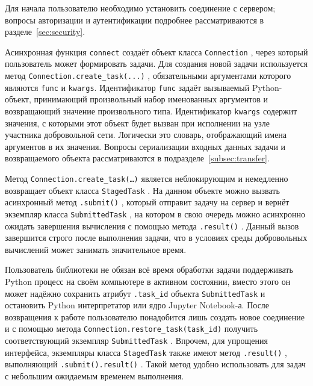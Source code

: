 \documentclass[a4paper,12pt]{extarticle}
\newcommand{\code}[1]{%
    \begingroup
    \setlength{\fboxsep}{1.2pt}%
    \colorbox{inlinecodebg}{\texttt{\textcolor{inlinecodefg}{#1}}}%
    \endgroup
}
\begin{document}
Для начала пользователю необходимо установить соединение с сервером; вопросы авторизации и аутентификации подробнее рассматриваются в разделе~\ref{sec:security}.

Асинхронная функция \code{connect} создаёт объект класса \code{Connection}, через который пользователь может формировать задачи.
Для создания новой задачи используется метод \code{Connection.create\_task(...)}, обязательными аргументами которого являются \texttt{func} и \newline\texttt{kwargs}.
Идентификатор \texttt{func} задаёт вызываемый Python-объект, принимающий произвольный набор именованных аргументов и возвращающий значение произвольного типа.
Идентификатор \texttt{kwargs} содержит значения, с которыми этот объект будет вызван при исполнении на узле участника добровольной сети.
Логически это словарь, отображающий имена аргументов в их значения.
Вопросы сериализации входных данных задачи и возвращаемого объекта рассматриваются в подразделе~\ref{subsec:transfer}.

Метод \code{Connection.create\_task(\ldots)} является неблокирующим и немедленно возвращает объект класса \code{StagedTask}.
На данном объекте можно вызвать асинхронный метод \code{.submit()}, который отправит задачу на сервер и вернёт экземпляр класса \code{SubmittedTask}, на котором в свою очередь можно асинхронно ожидать завершения вычисления с помощью метода \code{.result()}.
Данный вызов завершится строго после выполнения задачи, что в условиях среды добровольных вычислений может занимать значительное время.

Пользователь библиотеки не обязан всё время обработки задачи поддерживать Python процесс на своём компьютере в активном состоянии, вместо этого он может надёжно сохранить атрибут \code{.task\_id} объекта \code{SubmittedTask} и остановить Python интерпретатор или ядро Jupyter Notebook-а.
После возвращения к работе пользователю понадобится лишь создать новое соединение и с помощью метода \code{Connection.restore\_task(task\_id)} получить соответствующий экземпляр \code{SubmittedTask}.
Впрочем, для упрощения интерфейса, экземпляры класса \code{StagedTask} также имеют метод \code{.result()}, выполняющий \code{.submit().result()}.
Такой метод удобно использовать для задач с небольшим ожидаемым временем выполнения.
\end{document}
